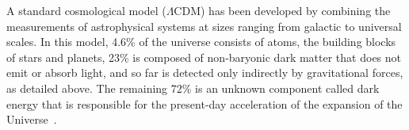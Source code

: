 A standard cosmological model ($\Lambda$CDM) has been developed by combining the measurements of astrophysical systems at sizes ranging from galactic to universal scales. In this model, 4.6\% of the universe consists of atoms, the building blocks of stars and planets, 23\% is composed of non-baryonic dark matter that does not emit or absorb light, and so far is detected only indirectly by gravitational forces, as detailed above.  The remaining 72\% is an unknown component called dark energy that is responsible for the present-day acceleration of the expansion of the Universe~\cite{DarkEnergy}.



